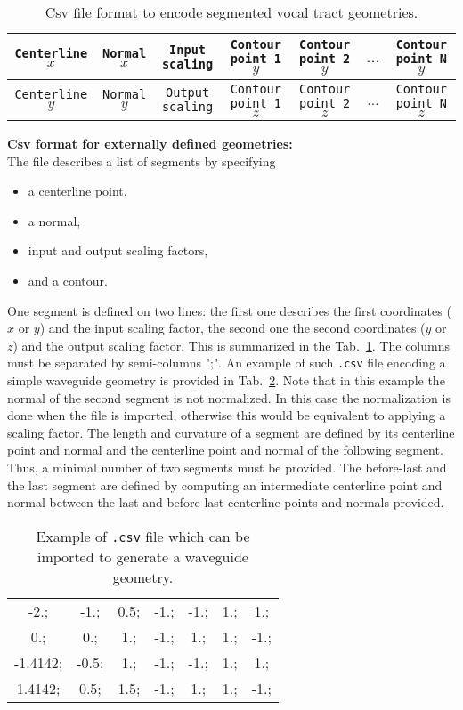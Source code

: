 \documentclass[]{article}
\begin{document}
\begin{table}
	\centering
	\begin{tabular}{c c c c c c c}
		\hline
		\texttt{Centerline} $x$ & \texttt{Normal} $x$ & 
		\texttt{Input scaling} & \texttt{Contour point 1} $y$ &  
		\texttt{Contour point 2} $y$ & ... 
		& \texttt{Contour point N} $y$ \\
		\hline
		\texttt{Centerline} $y$ & \texttt{Normal} $y$ & 
		\texttt{Output scaling} & \texttt{Contour point 1} $z$ &  
		\texttt{Contour point 2} $z$ & ... 
		& \texttt{Contour point N} $z$ \\
		\hline
	\end{tabular}
\caption{Csv file format to encode segmented vocal tract geometries.}
\label{table:csv_file_format}
\end{table}
	
	\textbf{Csv format for externally defined geometries:}\\
	The file describes a list of segments by specifying
	\begin{itemize}
		\item a centerline point,
		\item a normal,
		\item input and output scaling factors,
		\item and a contour.
	\end{itemize}
	One segment is defined on two lines: the first one describes the 
	first coordinates ($x$ or $y$) and the input scaling factor, the second one the second coordinates ($y$ or $z$) and the output scaling factor. 
	This is summarized in the Tab.~\ref{table:csv_file_format}.
	The columns must be separated by semi-columns ";". 
	An example of such \texttt{.csv} file encoding a simple waveguide
	geometry is provided in Tab.~\ref{table:example_csv_file}.
	Note that in this example the normal of the second segment is not normalized.
	In this case the normalization is done when the file is imported, otherwise
	this would be equivalent to applying a scaling factor.
	The length and curvature of a segment are defined by its centerline
	point and normal and the centerline point and normal of the 
	following segment.
	Thus, a minimal number of two segments must be provided. 
	The before-last and the last segment are defined by computing an 
	intermediate centerline point and normal between the last and 
	before last centerline points and normals provided.
	
	\begin{table}
		\centering
		\begin{tabular}{c c c c c c c }
			-2.;& -1.;& 0.5;& -1.;& -1.;& 1.;& 1.; \\
			0.;& 0.;& 1.;& -1.;& 1.;& 1.;& -1.; \\
			-1.4142;& -0.5;& 1.;& -1.;& -1.;& 1.;& 1.; \\
			1.4142;& 0.5;& 1.5;& -1.;& 1.;& 1.;& -1.; 
		\end{tabular}
		\caption{Example of \texttt{.csv} file which can be imported to generate a waveguide geometry.}
		\label{table:example_csv_file}
	\end{table}
\end{document}
